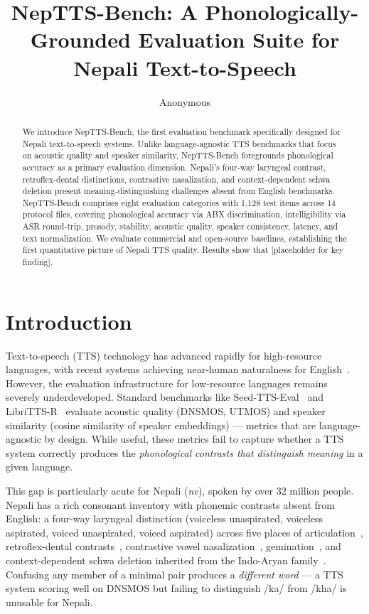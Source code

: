 \documentclass{Interspeech}
\title{NepTTS-Bench: A Phonologically-Grounded Evaluation Suite for Nepali Text-to-Speech}
\author[affiliation={1}]{Anonymous}{Author}
\begin{document}
\maketitle

\begin{abstract}
We introduce NepTTS-Bench, the first evaluation benchmark specifically designed for Nepali text-to-speech systems. Unlike language-agnostic TTS benchmarks that focus on acoustic quality and speaker similarity, NepTTS-Bench foregrounds phonological accuracy as a primary evaluation dimension. Nepali's four-way laryngeal contrast, retroflex-dental distinctions, contrastive nasalization, and context-dependent schwa deletion present meaning-distinguishing challenges absent from English benchmarks. NepTTS-Bench comprises eight evaluation categories with 1,128 test items across 14 protocol files, covering phonological accuracy via ABX discrimination, intelligibility via ASR round-trip, prosody, stability, acoustic quality, speaker consistency, latency, and text normalization. We evaluate commercial and open-source baselines, establishing the first quantitative picture of Nepali TTS quality. Results show that [placeholder for key finding].
\end{abstract}

\section{Introduction}

Text-to-speech (TTS) technology has advanced rapidly for high-resource languages, with recent systems achieving near-human naturalness for English~\cite{SeedTTS2024, CosyVoice2024}. However, the evaluation infrastructure for low-resource languages remains severely underdeveloped. Standard benchmarks like Seed-TTS-Eval~\cite{SeedTTS2024} and LibriTTS-R~\cite{LibriTTSR2023} evaluate acoustic quality (DNSMOS, UTMOS) and speaker similarity (cosine similarity of speaker embeddings) --- metrics that are language-agnostic by design. While useful, these metrics fail to capture whether a TTS system correctly produces the \textit{phonological contrasts that distinguish meaning} in a given language.

This gap is particularly acute for Nepali (\textit{ne}), spoken by over 32 million people. Nepali has a rich consonant inventory with phonemic contrasts absent from English: a four-way laryngeal distinction (voiceless unaspirated, voiceless aspirated, voiced unaspirated, voiced aspirated) across five places of articulation~\cite{Khatiwada2009, Schwarz2019}, retroflex-dental contrasts~\cite{Khatiwada2007retroflex, Hamann2003}, contrastive vowel nasalization~\cite{Bandhu1971}, gemination~\cite{Khatiwada2009}, and context-dependent schwa deletion inherited from the Indo-Aryan family~\cite{Choudhury2004}. Confusing any member of a minimal pair produces a \textit{different word} --- a TTS system scoring well on DNSMOS but failing to distinguish /ka/ from /kha/ is unusable for Nepali.
\end{document}
